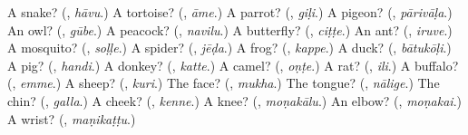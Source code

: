 \begin{tcolorbox}[breakable,colback=teal!4,colframe=teal!35!black,title={Before you move on}]
A snake? (\textbf{}, \emph{hāvu}.) A tortoise? (\textbf{}, \emph{āme}.) A parrot? (\textbf{}, \emph{giḷi}.) A pigeon? (\textbf{}, \emph{pārivāḷa}.) An owl? (\textbf{}, \emph{gūbe}.) A peacock? (\textbf{}, \emph{navilu}.) A butterfly? (\textbf{}, \emph{ciṭṭe}.) An ant? (\textbf{}, \emph{iruve}.) A mosquito? (\textbf{}, \emph{soḷḷe}.) A spider? (\textbf{}, \emph{jēḍa}.) A frog? (\textbf{}, \emph{kappe}.) A duck? (\textbf{}, \emph{bātukōḷi}.) A pig? (\textbf{}, \emph{handi}.) A donkey? (\textbf{}, \emph{katte}.) A camel? (\textbf{}, \emph{oṇṭe}.) A rat? (\textbf{}, \emph{ili}.) A buffalo? (\textbf{}, \emph{emme}.) A sheep? (\textbf{}, \emph{kuri}.) The face? (\textbf{}, \emph{mukha}.) The tongue? (\textbf{}, \emph{nālige}.) The chin? (\textbf{}, \emph{galla}.) A cheek? (\textbf{}, \emph{kenne}.) A knee? (\textbf{}, \emph{moṇakālu}.) An elbow? (\textbf{}, \emph{moṇakai}.) A wrist? (\textbf{}, \emph{maṇikaṭṭu}.)
\end{tcolorbox}
